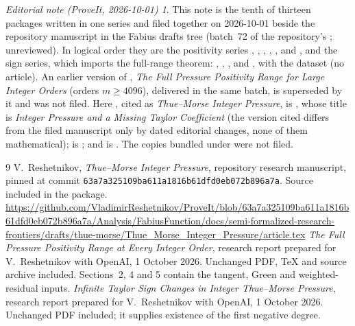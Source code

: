 \documentclass[11pt,a4paper]{article}
\theoremstyle{remark}\newtheorem*{ednote}{Editorial note (ProveIt, 2026-10-01)}
\begin{document}
\begin{ednote}
This note is the tenth of thirteen packages written in one series and filed together on 2026-10-01 beside the repository manuscript  in the Fabius drafts tree (batch~72 of the repository's ; unreviewed). In logical order they are the positivity series , , , , ,  and , and the sign series, which imports the full-range theorem: , , ,  and , with the dataset  (no article). An earlier version of , \emph{The Full Pressure Positivity Range for Large Integer Orders} (orders $m\ge4096$), delivered in the same batch, is superseded by it and was not filed.
Here \cite{Repo}, cited as \emph{Thue--Morse Integer Pressure}, is , whose title
is \emph{Integer Pressure and a Missing Taylor Coefficient} (the version cited differs from the filed manuscript only by dated editorial changes, none of them mathematical); \cite{AllOrders}
is ; and \cite{Signs} is . The copies
bundled under  were not filed.
\end{ednote}
\begin{thebibliography}{9}
 V.~Reshetnikov, \emph{Thue--Morse Integer Pressure}, repository research manuscript, pinned at commit \texttt{63a7a325109ba611a1816b61dfd0eb072b896a7a}. Source included in the package.\newline
\url{https://github.com/VladimirReshetnikov/ProveIt/blob/63a7a325109ba611a1816b61dfd0eb072b896a7a/Analysis/FabiusFunction/docs/semi-formalized-research-frontiers/drafts/thue-morse/Thue_Morse_Integer_Pressure/article.tex}
 \emph{The Full Pressure Positivity Range at Every Integer Order}, research report prepared for V.~Reshetnikov with OpenAI, 1 October 2026. Unchanged PDF, TeX and source archive included. Sections~2, 4 and 5 contain the tangent, Green and weighted-residual inputs.
 \emph{Infinite Taylor Sign Changes in Integer Thue--Morse Pressure}, research report prepared for V.~Reshetnikov with OpenAI, 1 October 2026. Unchanged PDF included; it supplies existence of the first negative degree.
\end{thebibliography}
\end{document}
